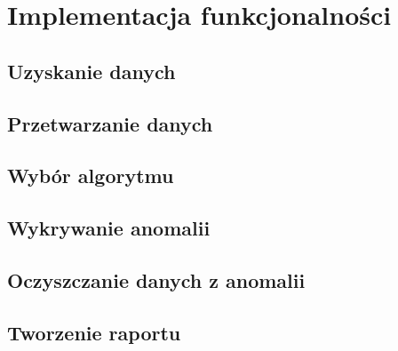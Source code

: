 \section{Implementacja funkcjonalności}

\subsection{Uzyskanie danych}

\subsection{Przetwarzanie danych}

\subsection{Wybór algorytmu}

\subsection{Wykrywanie anomalii}

\subsection{Oczyszczanie danych z anomalii}

\subsection{Tworzenie raportu}